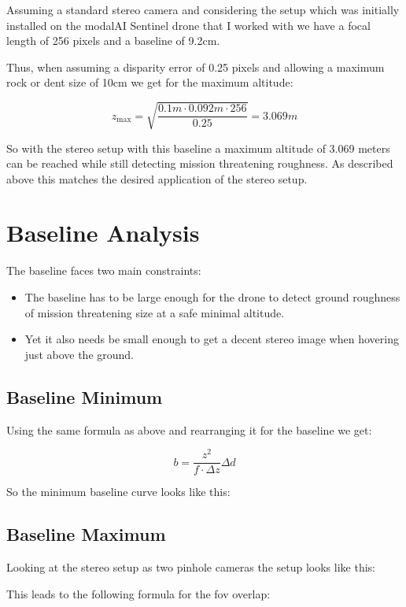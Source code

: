Assuming a standard stereo camera and considering the setup which was initially installed on the modalAI Sentinel drone that I worked with we have a focal length of 256 pixels and a baseline of 9.2cm.

Thus, when assuming a disparity error of 0.25 pixels and allowing a maximum rock or dent size of 10cm we get for the maximum altitude:

\begin{equation}
    z_{\text{max}} = \sqrt{\frac{0.1m \cdot 0.092 m \cdot 256}{0.25}} = 3.069m
\end{equation}

So with the stereo setup with this baseline a maximum altitude of 3.069 meters can be reached while still detecting mission threatening roughness. As described above this matches the desired application of the stereo setup.




\section{Baseline Analysis}
The baseline faces two main constraints:
\begin{itemize}
    \item The baseline has to be large enough for the drone to detect ground roughness of mission threatening size at a safe minimal altitude.
    \item Yet it also needs be small enough to get a decent stereo image when hovering just above the ground.
\end{itemize}

\subsection{Baseline Minimum}

Using the same formula as above and rearranging it for the baseline we get:

\begin{equation}
    b = \frac{z^2}{f \cdot \Delta z} \Delta d
\end{equation}

So the minimum baseline curve looks like this:

\subsection{Baseline Maximum}

Looking at the stereo setup as two pinhole cameras the setup looks like this:


This leads to the following formula for the fov overlap:


